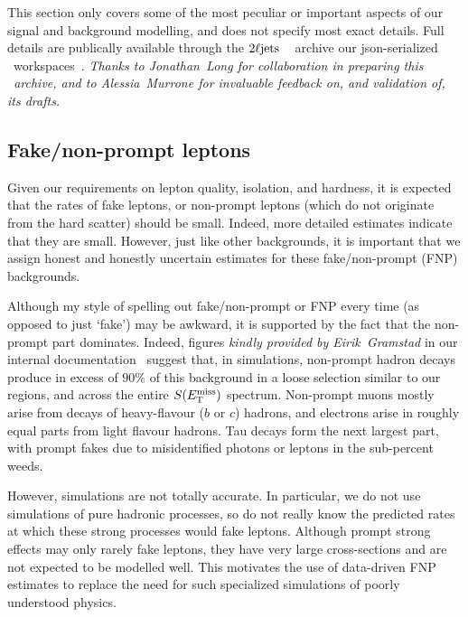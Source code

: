 This section only covers some of the most peculiar or important aspects
of our signal and background modelling, and does not specify most exact
details.
Full details are publically available through the $2\ell\mathrm{jets}$
\hepdata~\cite{hepdata.116034, Maguire_2017} archive our json-serialized \pyhf\
workspaces~\cite{cranmer2012histfactory, heinrich2021pyhf}.
\emph{Thanks to Jonathan~Long for collaboration in preparing this \hepdata\ archive,
and to Alessia~Murrone for invaluable feedback on, and validation of, its
drafts.}


\subsection{Fake/non-prompt leptons}
\label{sec:2ljets_mm_fakes}
Given our requirements on lepton quality, isolation, and hardness, it is
expected that the rates of fake leptons, or non-prompt leptons (which do not
originate from the hard scatter) should be small.
Indeed, more detailed estimates indicate that they are small.
However, just like other backgrounds, it is important that we assign
honest and honestly uncertain estimates for these fake/non-prompt (FNP)
backgrounds.

Although my style of spelling out fake/non-prompt or FNP every time
(as opposed to just `fake') may be awkward, it is supported by the fact that
the non-prompt part dominates.
Indeed, figures \emph{kindly provided by Eirik~Gramstad} in our internal
documentation~\cite{twoljets2018int} suggest that, in simulations, non-prompt
hadron decays produce in excess of $90\%$ of this background in a loose
selection similar to our regions, and across the entire $S(E_\mathrm{T}^\mathrm{miss})$ spectrum.
Non-prompt muons mostly arise from decays of heavy-flavour ($b$ or $c$)
hadrons, and electrons arise in roughly equal parts from light flavour hadrons.
Tau decays form the next largest part, with prompt fakes due to misidentified
photons or leptons in the sub-percent weeds.

However, simulations are not totally accurate.
In particular, we do not use simulations of pure hadronic processes, so do not
really know the predicted rates at which these strong processes would fake
leptons.
Although prompt strong effects may only rarely fake leptons, they have very
large cross-sections and are not expected to be modelled well.
This motivates the use of data-driven FNP estimates to replace the need for
such specialized simulations of poorly understood physics.


